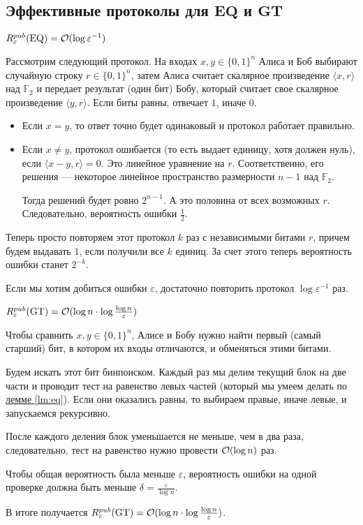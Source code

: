 \subsection{Эффективные протоколы для $ \mathbf{EQ}$ и  $ \mathbf{GT}$}
\begin{lm}\label{lm:eq}
	$ R^{pub}_{ \varepsilon } (\operatorname{EQ}) = \mathcal{O}( \log \varepsilon ^{-1})$
\end{lm}
\begin{proof*}
	Рассмотрим следующий протокол. На входах $ x, y \in  \{0, 1\}^{n}$ Алиса и Боб выбирают случайную строку $ r \in \{0, 1\}^{n}$, затем Алиса считает скалярное произведение $  \langle x, r \rangle$ над $ \mathbb{F}_2$ и передает результат (один бит) Бобу, который считает свое скалярное произведение $ \langle y, r \rangle$.  
	Если биты равны, отвечает $ 1$, иначе  $ 0$.

	\begin{itemize}
		\item Если  $ x = y$, то ответ точно будет одинаковый и протокол работает правильно.
		\item Если $ x \ne y$, протокол ошибается (то есть выдает единицу, хотя должен нуль), если $  \langle x  - y, r \rangle = 0$. Это линейное уравнение на $ r$. Соответственно, его решения --- некоторое линейное пространство размерности $ n-1$ над  $ \mathbb{F}_{2}$. 

			Тогда решений будет ровно $ 2^{n-1}$. А это половина от всех возможных $ r$. Следовательно, вероятность ошибки  $ \frac{1}{2}$.
	\end{itemize}
	Теперь просто повторяем этот протокол $ k$ раз с независимыми битами  $ r$, причем будем выдавать  $ 1$, если получили все  $k$ единиц. За счет этого теперь вероятность ошибки станет  $ 2^{-k}$. 

	Если мы хотим добиться ошибки $ \varepsilon $, достаточно повторить протокол $  \log \varepsilon ^{-1}$ раз.
\end{proof*}

\begin{lm}
	$ R_{ \varepsilon }^{pub}(\operatorname{GT}) = \mathcal{O}( \log n \cdot \log \frac{\log n}{\varepsilon})$
\end{lm}
\begin{proof*}
	Чтобы сравнить $ x, y \in \{0, 1\}^{n}$, Алисе и Бобу нужно найти первый (самый старший) бит, в котором их входы отличаются, и обменяться этими битами.

	Будем искать этот бит бинпоиском. Каждый раз мы делим текущий блок на две части и проводит тест на равенство левых частей (который мы умеем делать по \hyperref[lm:eq]{лемме \ref{lm:eq}}). Если они оказались равны, то выбираем правые, иначе левые, и запускаемся рекурсивно.

	После каждого деления блок уменьшается не меньше, чем в два раза, следовательно, тест на равенство нужно провести $ \mathcal{O}(\log n)$ раз.

	Чтобы общая вероятность была меньше $ \varepsilon $, вероятность ошибки на одной проверке должна быть меньше $ \delta  = \frac{\varepsilon}{\log n}$.

	В итоге получается $ R^{pub}_{ \varepsilon }(\operatorname{GT}) = \mathcal{O}( \log n \cdot  \log \tfrac{\log n}{\varepsilon})$.
\end{proof*}
